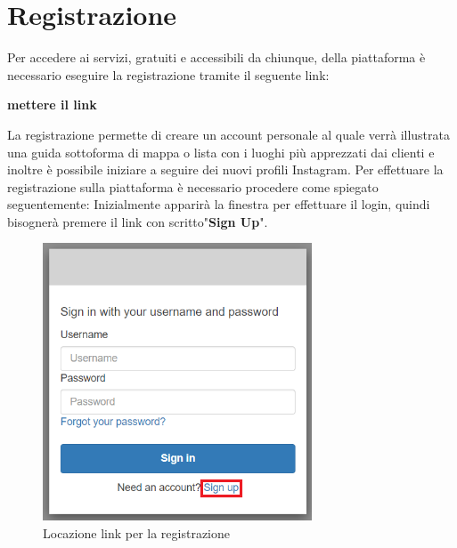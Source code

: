 \section{Registrazione} {

Per accedere ai servizi, gratuiti e accessibili da chiunque, della piattaforma \platform è necessario eseguire la registrazione tramite il seguente link:
\begin{center}
    \textbf{mettere il link} 
\end{center} 
La registrazione permette di creare un account personale al quale verrà illustrata una guida sottoforma di mappa o lista con i luoghi più apprezzati dai clienti e 
inoltre è possibile iniziare a seguire dei nuovi profili Instagram. \aCapo
Per effettuare la registrazione sulla piattaforma \platform è necessario procedere come spiegato seguentemente: \aCapo 
Inizialmente apparirà la finestra per effettuare il login, quindi bisognerà premere il link con scritto"\textbf{Sign Up}".
\begin{figure}[H]
    \includegraphics[width=8cm]{sezioni/images/tasto-reg.png}
    \centering
    \caption{Locazione link per la registrazione}
\end{figure}

}
